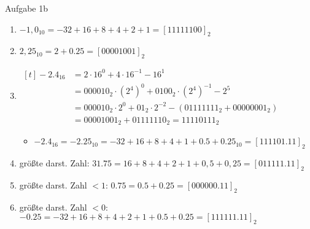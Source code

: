 \begin{frame}{Aufgabe 1b}

  \begin{solutionnoinc}
\begin{enumerate}
  \item $-1,0_{10} = -32+16+8+4+2+1 = [11111100]_2$
  \item $2,25_{10} = 2+0.25 = [00001001]_2$
        \item $\begin{aligned}[t]
        -2.4_{16} &= 2 \cdot 16^0 + 4 \cdot 16^{-1} - 16^{1} \\
        &= 000010_2 \cdot (2^4)^0 + 0100_2 \cdot (2^4)^{-1} - 2^5 \\
        &= 000010_2 \cdot 2^0 + 01_2 \cdot 2^{-2} - (01111111_2 + 00000001_2)  \\
        &= 00001001_2 + 01111110_2 = 11110111_2
        \end{aligned}$
        \begin{itemize}
          \item $-2.4_{16}=-2.25_{10}=-32+16+8+4+1+0.5+0.25_{10}=[111101.11]_2$
        \end{itemize}
        \item größte darst. Zahl: $31.75 = 16+8+4+2+1+0,5+0,25 = [011111.11]_2$
        \item größte darst. Zahl $ < 1$: $0.75 = 0.5 + 0.25 = [000000.11]_2$
        \item größte darst. Zahl $ < 0$: $-0.25 = -32 + 16 + 8 + 4 + 2 + 1 + 0.5 + 0.25 = [111111.11]_2$
    \end{enumerate}
  \end{solutionnoinc}



\end{frame}
